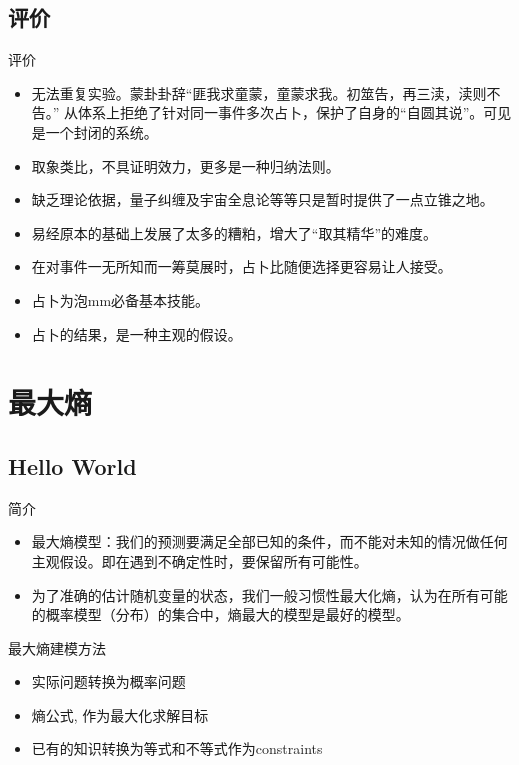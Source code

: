 \documentclass{beamer}
\begin{document}
\subsection{评价}
\begin{frame}{评价}
  \begin{itemize}
    \item 无法重复实验。蒙卦卦辞“匪我求童蒙，童蒙求我。初筮告，再三渎，渎则不告。”
      从体系上拒绝了针对同一事件多次占卜，保护了自身的“自圆其说”。可见是一个封闭的系统。
    \item 取象类比，不具证明效力，更多是一种归纳法则。
    \item 缺乏理论依据，量子纠缠及宇宙全息论等等只是暂时提供了一点立锥之地。
    \item 易经原本的基础上发展了太多的糟粕，增大了“取其精华”的难度。
    \item 在对事件一无所知而一筹莫展时，占卜比随便选择更容易让人接受。
    \item 占卜为泡mm必备基本技能。
    \item 占卜的结果，是一种主观的假设。
  \end{itemize}
\end{frame}
     

\section{最大熵}
\subsection{Hello World}
\begin{frame}{简介}
  \begin{itemize}
    \item 
  最大熵模型：我们的预测要满足全部已知的条件，而不能对未知的情况做任何主观假设。即在遇到不确定性时，要保留所有可能性。
\item
  为了准确的估计随机变量的状态，我们一般习惯性最大化熵，认为在所有可能的概率模型（分布）的集合中，熵最大的模型是最好的模型。
  \end{itemize}
\end{frame}
\begin{frame}{最大熵建模方法}
  \begin{itemize}
    \item 实际问题转换为概率问题
    \item 熵公式, 作为最大化求解目标
    \item 已有的知识转换为等式和不等式作为constraints
  \end{itemize}
\end{frame}
\end{document}
